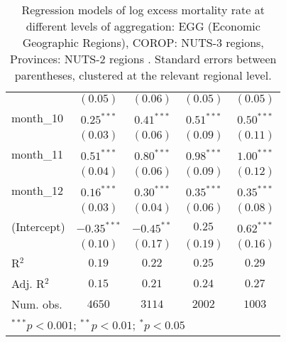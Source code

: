 \begin{table}[h!]
\begin{center}
\begin{small}
\begin{tabular}{l c c c c}
               & $(0.05)$      & $(0.06)$      & $(0.05)$      & $(0.05)$      \\
month\_10      & $0.25^{***}$  & $0.41^{***}$  & $0.51^{***}$  & $0.50^{***}$  \\
               & $(0.03)$      & $(0.06)$      & $(0.09)$      & $(0.11)$      \\
month\_11      & $0.51^{***}$  & $0.80^{***}$  & $0.98^{***}$  & $1.00^{***}$  \\
               & $(0.04)$      & $(0.06)$      & $(0.09)$      & $(0.12)$      \\
month\_12      & $0.16^{***}$  & $0.30^{***}$  & $0.35^{***}$  & $0.35^{***}$  \\
               & $(0.03)$      & $(0.04)$      & $(0.06)$      & $(0.08)$      \\
(Intercept)    & $-0.35^{***}$ & $-0.45^{**}$  & $0.25$        & $0.62^{***}$  \\
               & $(0.10)$      & $(0.17)$      & $(0.19)$      & $(0.16)$      \\
\hline
R$^2$          & $0.19$        & $0.22$        & $0.25$        & $0.29$        \\
Adj. R$^2$     & $0.15$        & $0.21$        & $0.24$        & $0.27$        \\
Num. obs.      & $4650$        & $3114$        & $2002$        & $1003$        \\
\hline
\multicolumn{5}{l}{\tiny{$^{***}p<0.001$; $^{**}p<0.01$; $^{*}p<0.05$}}
\end{tabular}
\end{small}
\caption{Regression models of log excess mortality rate at different levels of aggregation: EGG (Economic Geographic Regions), COROP: NUTS-3 regions, Provinces: NUTS-2 regions . Standard errors between parentheses, clustered at the relevant regional level.}
\label{tab:regionmodels}
\end{center}
\end{table}
